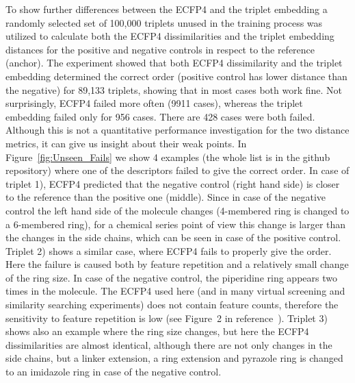 \documentclass[doublespacing]{bmcart}
\begin{document}
To show further differences between the ECFP4 and the triplet embedding a randomly selected set of 100,000 triplets unused in the training process was utilized to calculate  both the ECFP4 dissimilarities and the triplet embedding distances for the positive and negative controls in respect to the reference (anchor). The experiment showed that both ECFP4 dissimilarity and the triplet embedding determined the correct order (positive control has lower distance than the negative) for 89,133 triplets, showing that in most cases both work fine. Not surprisingly, ECFP4 failed more often (9911 cases), whereas the triplet embedding failed only for 956 cases. There are 428 cases were both failed. Although this is not a quantitative performance investigation for the two distance metrics, it can give us insight about their weak points. In Figure~\ref{fig:Unseen_Fails} we show 4 examples (the whole list is in the github repository) where one of the descriptors failed to give the correct order. In case of triplet 1), ECFP4 predicted that the negative control (right hand side) is closer to the reference than the positive one (middle). Since in case of the negative control the left hand side of the molecule changes (4-membered ring is changed to a 6-membered ring), for a chemical series point of view this change is larger than the changes in the side chains, which can be seen in case of the positive control.
Triplet 2) shows a similar case, where ECFP4 fails to properly give the order. Here the failure is caused both by feature repetition and a relatively small change of the ring size. In case of the negative control, the piperidine ring appears two times in the molecule. The ECFP4 used here (and in many virtual screening and similarity searching experiments) does not contain feature counts, therefore the sensitivity to feature repetition is low (see Figure~2 in reference~\cite{flower1998properties}). Triplet 3) shows also an example where the ring size changes, but here the ECFP4 dissimilarities are almost identical, although there are not only changes in the side chains, but a linker extension, a ring extension and pyrazole ring is changed to an imidazole ring in case of the negative control. 
\end{document}
